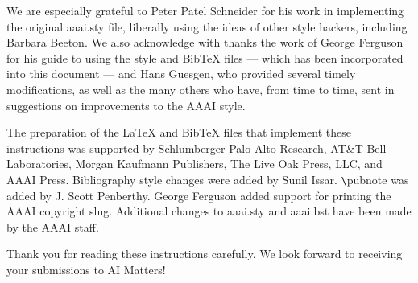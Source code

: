 \documentclass[letterpaper]{article}
\begin{document}
We are especially grateful to Peter Patel Schneider for his work in implementing the original aaai.sty file, liberally using the ideas of other style hackers, including Barbara Beeton. We also acknowledge with thanks the work of George Ferguson for his guide to using the style and BibTeX files --- which has been incorporated into this document  --- and Hans Guesgen, who provided several timely modifications, as well as the many others who have, from time to time, sent in suggestions on improvements to the AAAI style. 

The preparation of the \LaTeX{} and Bib\TeX{} files that implement these instructions was supported by Schlumberger Palo Alto Research, AT\&T Bell Laboratories, Morgan Kaufmann Publishers, The Live Oak Press, LLC, and AAAI Press. Bibliography style changes were added by Sunil Issar. \verb+\+pubnote was added by J. Scott Penberthy. George Ferguson added support for printing the AAAI copyright slug. Additional changes to aaai.sty and aaai.bst have been made by the AAAI staff.

\bigskip
\noindent Thank you for reading these instructions carefully. We look forward to receiving your submissions to AI Matters!
\end{document}
